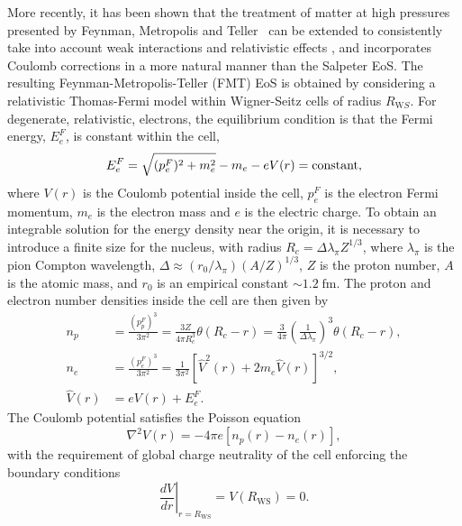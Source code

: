 More recently, it has been shown that the treatment of matter at high pressures presented by Feynman, Metropolis and Teller~\cite{Feynman:1949zz_Equationsstateelements} can be extended to consistently take into account weak interactions and relativistic effects \cite{Rotondo:2009cr_RelativisticThomasFermitreatment,Rotondo:2011zz_RelativisticFeynmanMetropolisTellertheory}, and incorporates Coulomb corrections in a more natural manner than the Salpeter EoS. The resulting Feynman-Metropolis-Teller (FMT) EoS is obtained by considering a relativistic Thomas-Fermi model within Wigner-Seitz cells of radius $R_{\mathrm WS}$. 
For degenerate, relativistic, electrons, the equilibrium condition is that the Fermi energy, $E_e^F$, is constant within the cell,
\begin{equation}\label{ch2:eq:rel_equil}
E_e^F=\sqrt{(p_e^F)^2+m_e^2}-m_e-eV(r) = \rm{constant},
\end{equation}
where $V(r)$ is the Coulomb potential inside the cell, $p_e^F$ is the electron Fermi momentum, $m_e$ is the electron mass and $e$ is the electric charge. To obtain an integrable solution for the energy density near the origin, it is necessary to introduce a finite size for the nucleus, with radius $ R_c = \Delta\lambda_{\pi} Z^{1/3}$, 
where $\lambda_\pi$ is the pion Compton wavelength, $\Delta \approx (r_0 /\lambda_\pi)(A/Z)^{1/3}$, $Z$ is the proton number, $A$ is the atomic mass, and $r_0$ is an empirical constant $\sim 1.2\;\text{fm}$. The proton and electron number densities inside the cell are then given by
\begin{align}
    n_p &=  \frac{(p^F_p)^3}{3\pi^2} =\frac{3Z}{4\pi R_c^3}\theta( R_c - r ) = \frac{3}{4\pi} \left( \frac{1}{\Delta \lambda_\pi} \right)^3 \theta(R_c -r), \label{ch2:eq:prot_dens_FMT}\\
    n_e &= \frac{(p^F_e)^3}{3\pi^2} = \frac{1}{3\pi^2}\left[ \hat{V}^2(r) + 2m_e \hat{V}(r)\right]^{3/2},\label{ch2:eq:elec_dens_FMT}\\
    \hat{V}(r) &= eV(r) + E_e^F. \label{ch2:eq:vhat}
\end{align}
The Coulomb potential satisfies the Poisson equation 
\begin{equation}
    \nabla^2 V(r) = -4\pi e[n_p(r) - n_e(r)],
    \label{ch2:eq:poisson_WS_cell}
\end{equation} 
with the requirement of global charge neutrality of the cell enforcing the boundary conditions
\begin{equation}
    \left.\frac{dV}{dr}\right|_{r = R_\mathrm{WS}} = V(R_\mathrm{WS}) = 0.
\end{equation}
